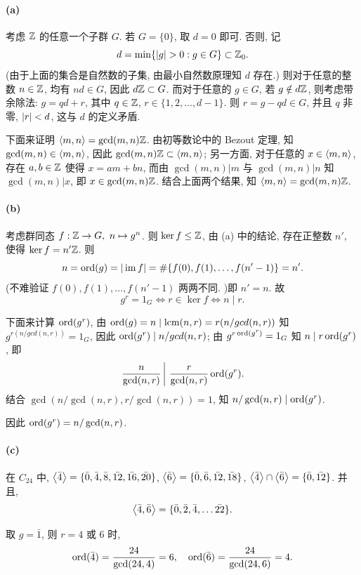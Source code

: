 \documentclass{article}
\begin{document}
\begin{solution}
	\paragraph{(a)} 考虑 $\mathbb{Z}$ 的任意一个子群 $G$. 若 $G = \{0\}$, 取 $d = 0$ 即可. 否则, 记
	\[ d = \min\{\abs{g}>0: g\in G\} \subset \Z_0. \]
	(由于上面的集合是自然数的子集, 由最小自然数原理知 $d$ 存在.) 则对于任意的整数 $n \in \mathbb{Z}$, 均有 $nd \in G$, 因此 $d\mathbb{Z} \subset G$. 而对于任意的 $g\in G$, 若 $g\notin d\mathbb{Z}$, 则考虑带余除法: $g = qd+r$, 其中 $q\in\mathbb{Z}$, $r\in\{1,2,\dots,d-1\}$. 则 $r = g-qd \in G$, 并且 $q$ 非零, $\left|r\right|<d$, 这与 $d$ 的定义矛盾.

	下面来证明 $\left\langle m,n \right\rangle = \gcd(m,n)\mathbb{Z}$. 由初等数论中的 Bezout 定理, 知 $\gcd(m,n)\in \left\langle m,n \right\rangle$, 因此 $\gcd(m,n)\mathbb{Z} \subset \left\langle m,n \right\rangle$; 另一方面, 对于任意的 $x \in \left\langle m,n \right\rangle$, 存在 $a,b\in\mathbb{Z}$ 使得 $x = am+bn$, 而由 $\gcd(m,n) | m$ 与 $\gcd(m,n) | n$ 知 $\gcd(m,n) | x$, 即 $x \in \gcd(m,n)\mathbb{Z}$. 结合上面两个结果, 知 $\left\langle m,n \right\rangle = \gcd(m,n)\mathbb{Z}$.

	\paragraph{(b)} 考虑群同态 $f: \mathbb{Z} \to G,\ n \mapsto g^n$. 则 $\ker f \le \mathbb{Z}$, 由 (a) 中的结论, 存在正整数 $n'$, 使得 $\ker f = n'\mathbb{Z}$. 则
	\[ n = \operatorname{ord}(g) = |\operatorname{im} f| = \#\{f(0), f(1), \dots, f(n'-1)\} = n'. \]
	(不难验证 $f(0), f(1), \dots,f(n'-1)$ 两两不同. )即 $n'=n$. 故
	\[ g^r = 1_G \Longleftrightarrow r \in \ker f \Longleftrightarrow n \mid r. \]

	下面来计算 $\operatorname{ord}(g^r)$, 由 $\operatorname{ord}(g) = n \mid \operatorname{lcm}(n,r) = r (n/gcd(n,r))$ 知 $g^{r(n/gcd(n,r))} = 1_G$, 因此 $\operatorname{ord}(g^r) \mid n/gcd(n,r)$; 由 $g^{r \operatorname{ord}(g^r)} = 1_G$ 知 $n \mid r \operatorname{ord}(g^r)$, 即
	\[ \left. \frac{n}{\gcd(n,r)}\,\right|\, \frac{r}{\gcd(n,r)} \operatorname{ord}(g^r).  \]
	结合 $\gcd(n/\gcd(n,r), r/\gcd(n,r)) = 1$, 知 $n/\gcd(n,r) \mid \operatorname{ord}(g^r)$. 

	因此 $\operatorname{ord}(g^r) = n/\gcd(n,r)$.

	\paragraph{(c)} 在 $C_{24}$ 中, $\left\langle \bar{4} \right\rangle = \{\bar{0}, \bar{4}, \bar{8}, \bar{12}, \bar{16}, \bar{20}\}$, $\left\langle \bar{6} \right\rangle = \{\bar{0}, \bar{6}, \bar{12}, \bar{18}\}$, $\left\langle \bar{4} \right\rangle \cap \left\langle \bar{6} \right\rangle = \{\bar{0}, \bar{12}\}$. 并且, 
	\[ \left\langle \bar{4}, \bar{6} \right\rangle = \{\bar{0}, \bar{2}, \bar{4}, \dots \bar{22}\}. \]

	取 $g = \bar{1}$, 则 $r = 4$ 或 $6$ 时, 
	\[ \operatorname{ord}(\bar{4}) = \frac{24}{\gcd(24,4)} = 6, \quad \operatorname{ord}(\bar{6}) = \frac{24}{\gcd(24,6)} = 4. \]
\end{solution}
\end{document}
